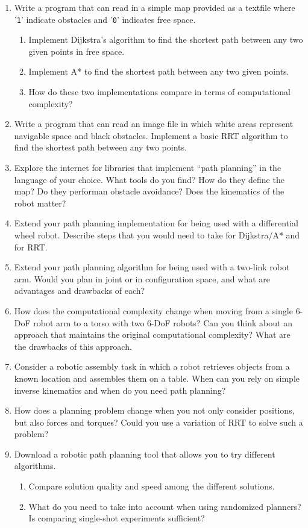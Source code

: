 \begin{enumerate}
\item Write a program that can read in a simple map provided as a textfile where '\texttt{1}' indicate obstacles and '\texttt{0}' indicates free space.
\begin{enumerate}
\item Implement Dijkstra's algorithm to find the shortest path between any two given points in free space.
\item Implement A* to find the shortest path between any two given points.
\item How do these two implementations compare in terms of computational complexity?
\end{enumerate}
\item Write a program that can read an image file in which white areas represent navigable space and black obstacles. Implement a basic RRT algorithm to find the shortest path between any two points.
\item Explore the internet for libraries that implement ``path planning'' in the language of your choice. What tools do you find? How do they define the map? Do they performan obstacle avoidance? Does the kinematics of the robot matter?
\item Extend your path planning implementation for being used with a differential wheel robot. Describe steps that you would need to take for Dijkstra/A* and for RRT.
\item Extend your path planning algorithm for being used with a two-link robot arm. Would you plan in joint or in configuration space, and what are advantages and drawbacks of each?
\item How does the computational complexity change when moving from a single 6-DoF robot arm to a torso with two 6-DoF robots? Can you think about an approach that maintains the original computational complexity? What are the drawbacks of this approach.
\item Consider a robotic assembly task in which a robot retrieves objects from a known location and assembles them on a table. When can you rely on simple inverse kinematics and when do you need path planning?
\item How does a planning problem change when you not only consider positions, but also forces and torques? Could you use  a variation of RRT to solve such a problem?
\item Download a robotic path planning tool that allows you to try different algorithms.
\begin{enumerate}
\item Compare solution quality and speed among the different solutions.
\item What do you need to take into account when using randomized planners? Is comparing single-shot experiments sufficient?
\end{enumerate}
\end{enumerate}

\normalsize
